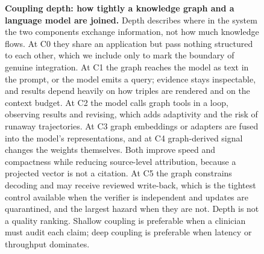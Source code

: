 \begin{figure}[!t]
\centering
{}
\caption{\textbf{Coupling depth: how tightly a knowledge graph and a language model are joined.} Depth describes where in the system the two components exchange information, not how much knowledge flows. At C0 they share an application but pass nothing structured to each other, which we include only to mark the boundary of genuine integration. At C1 the graph reaches the model as text in the prompt, or the model emits a query; evidence stays inspectable, and results depend heavily on how triples are rendered and on the context budget. At C2 the model calls graph tools in a loop, observing results and revising, which adds adaptivity and the risk of runaway trajectories. At C3 graph embeddings or adapters are fused into the model's representations, and at C4 graph-derived signal changes the weights themselves. Both improve speed and compactness while reducing source-level attribution, because a projected vector is not a citation. At C5 the graph constrains decoding and may receive reviewed write-back, which is the tightest control available when the verifier is independent and updates are quarantined, and the largest hazard when they are not. Depth is not a quality ranking. Shallow coupling is preferable when a clinician must audit each claim; deep coupling is preferable when latency or throughput dominates.}
\label{fig:coupling}
\end{figure}

